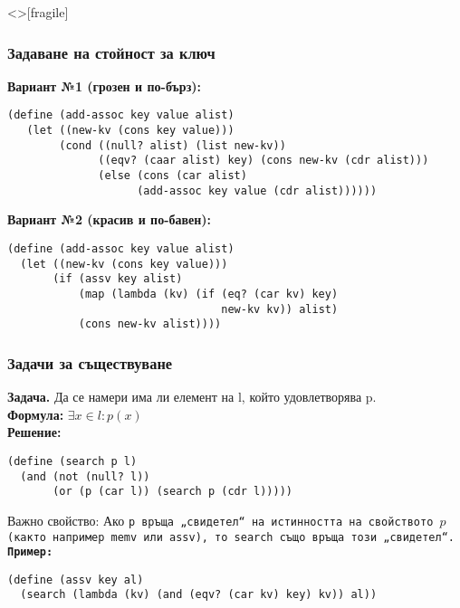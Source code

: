 \documentclass[alsotrans,beameroptions={aspectratio=169}]{beamerswitch}
\begin{document}
\begin{frame}<>[fragile]
  \frametitle{Задаване на стойност за ключ}
\small
  \textbf{Вариант №1 (грозен и по-бърз):}
\begin{lstlisting}
(define (add-assoc key value alist)
   (let ((new-kv (cons key value)))
        (cond ((null? alist) (list new-kv))
              ((eqv? (caar alist) key) (cons new-kv (cdr alist)))
              (else (cons (car alist)
                    (add-assoc key value (cdr alist))))))
\end{lstlisting}
  \pause
  \textbf{Вариант №2 (красив и по-бавен):}
\begin{lstlisting}
(define (add-assoc key value alist)
  (let ((new-kv (cons key value)))
       (if (assv key alist)
           (map (lambda (kv) (if (eq? (car kv) key)
                                 new-kv kv)) alist)
           (cons new-kv alist))))
\end{lstlisting}
\end{frame}

\begin{frame}[fragile]
  \frametitle{Задачи за съществуване}

  \textbf{Задача.} Да се намери има ли елемент на l, който удовлетворява p.\\
  \pause
  \textbf{Формула:} $\exists x\in l: p(x)$\\
  \pause
  \textbf{Решение:}
\begin{lstlisting}
(define (search p l)
  (and (not (null? l))
       (or (p (car l)) (search p (cdr l)))))
\end{lstlisting}
  \pause
  \alert{Важно свойство:} Ако \tt p връща „свидетел“ на истинността на свойството $p$ (както например \tt{memv} или \tt{assv}), то \tt{search} също връща този „свидетел“.\\
  \pause
  \textbf{Пример:}
\begin{lstlisting}
(define (assv key al)
  (search (lambda (kv) (and (eqv? (car kv) key) kv)) al))
\end{lstlisting}
\end{frame}
\end{document}
